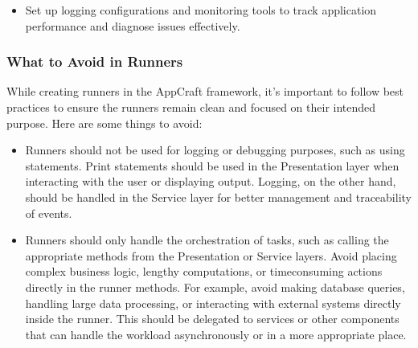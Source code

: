 \documentclass[letterpaper,10pt,english]{sphinxhowto}
\begin{document}
\begin{itemize}
\begin{description}
\end{description}

\item {} \begin{description}
\sphinxAtStartPar
Set up logging configurations and monitoring tools to track application performance and diagnose issues effectively.

\end{description}

\end{itemize}


\subsubsection{What to Avoid in Runners}
\label{\detokenize{architecture/runner/index:what-to-avoid-in-runners}}
\sphinxAtStartPar
While creating runners in the AppCraft framework, it’s important to follow best practices to ensure the runners remain clean and focused on their intended purpose. Here are some things to avoid:
\begin{itemize}
\item {} \begin{description}
\sphinxAtStartPar
Runners should not be used for logging or debugging purposes, such as using  statements. Print statements should be used in the Presentation layer when interacting with the user or displaying output. Logging, on the other hand, should be handled in the Service layer for better management and traceability of events.

\end{description}

\item {} \begin{description}
\sphinxAtStartPar
Runners should only handle the orchestration of tasks, such as calling the appropriate methods from the Presentation or Service layers. Avoid placing complex business logic, lengthy computations, or time\sphinxhyphen{}consuming actions directly in the runner methods.
For example, avoid making database queries, handling large data processing, or interacting with external systems directly inside the runner. This should be delegated to services or other components that can handle the workload asynchronously or in a more appropriate place.

\end{description}

\end{itemize}
\end{document}
